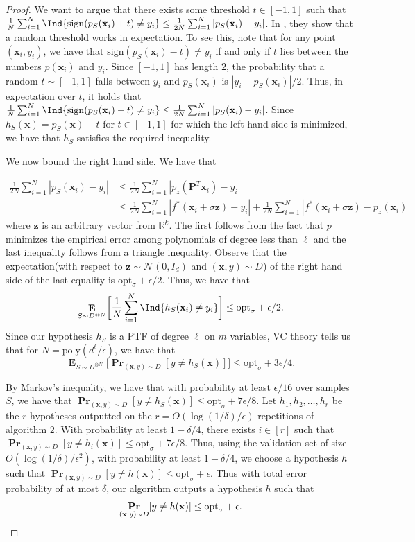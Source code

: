 \documentclass{theoretics}
\renewcommand\vec[1]{\mathbf{#1}}
\DeclareMathOperator*{\pr}{\mathbf{Pr}}
\DeclareMathOperator*{\E}{\mathbf{E}}
\newcommand{\R}{\mathbb{R}}
\newcommand{\poly}{\mathrm{poly}}
\newcommand{\sign}{\mathrm{sign}}
\newcommand{\1}{\Ind}
\newcommand{\smoothopt}{\mathrm{opt}_{\sigma}}
\newcommand{\x}{\vec x}
\newcommand{\z}{\vec z}
\newcommand{\Gauss}{\mathcal{N}}
\newcommand{\Djoint}{D}
\begin{document}
\begin{proof}
    We want to argue that there exists some threshold $t\in [-1,1]$ such that 
    $\frac{1}{N}\sum_{i=1}^{N} \1\{\sign(p_S(\x_i)+t)\neq y_i\}\leq \frac{1}{2N}\sum_{i=1}^{N}|p_S(\x_i)-y_i|$. In \cite{KKMS:05}, they show that a random threshold works in expectation. To see this, note that for any point $(\x_i,y_i)$, we have that $\sign(p_S(\x_i)-t)\neq y_i$ if and only if $t$ lies between the numbers $p(\x_i)$ and $y_i$. Since $[-1,1]$ has length $2$, the probability that a random $t\sim [-1,1]$ falls between $y_i$ and $p_S(\x_i)$ is $|y_i-p_S(\x_i)|/2$. Thus, in expectation over $t$, it holds that $\frac{1}{N}\sum_{i=1}^{N} \1\{\sign(p_S(\x_i)-t)\neq y_i\}\leq \frac{1}{2N}\sum_{i=1}^{N}|p_S(\x_i)-y_i|$. Since $h_S(\x)=p_S(\x)-t$  for  $t\in[-1,1]$ for which the left hand side is minimized, we have that $h_S$ satisfies the required inequality.
    
      We now bound the right hand side. We have that
    
    \begin{align*}
    \frac{1}{2N}\sum_{i=1}^{N}|p_S(\x_i)-y_i|
    &\leq \frac{1}{2N}\sum_{i=1}^{N}|{p}_{z}(\vec P^T \x_i)-y_i|\\
    &\leq \frac{1}{2N}\sum_{i=1}^{N}|f^*(\x_i+\sigma \z)-y_i|+\frac{1}{2N}\sum_{i=1}^{N}|f^*(\x_i+\sigma\z)-{p}_z(\x_i)|
    \end{align*}
    where $\z$ is an arbitrary vector from $\R^{k}$. The first follows from the fact that $p$ minimizes the empirical error among polynomials of degree less than $\ell$ and the last inequality follows from a triangle inequality. Observe that the expectation(with respect to $\z\sim \Gauss(0,I_d)$ and $(\x,y)\sim D$) of the right hand side of the last equality is $\smoothopt+\epsilon/2$.  
    Thus, we have that 
\[
\E_{S\sim D^{\otimes N}}\biggl[\frac{1}{N}\sum_{i=1}^{N}\1\{h_S(\x_i)\neq y_i\}\biggr]\leq \smoothopt+\epsilon/2.
\] Since our hypothesis $h_S$ is a PTF of degree $\ell$ on $m$ variables, VC theory tells us that for $N=\poly(d^{\ell}/\epsilon)$, we have that 
\[
\E_{S\sim D^{\otimes N}}\biggl[\pr_{(\x, y) \sim \Djoint}[y\neq h_S(\x)]\biggr]\leq \smoothopt+3\epsilon/4.
\] 

By Markov's inequality, we have that with probability at least $\epsilon/16$ over samples $S$, we have that $\pr_{(\x, y) \sim \Djoint}[y\neq h_S(\x)]\leq \smoothopt+ 7\epsilon/8$. Let $h_1,h_2,\ldots, h_r$ be the $r$ hypotheses outputted on the $r=O(\log(1/\delta)/\epsilon)$ repetitions of algorithm $2$. With probability at least $1-\delta/4$, there exists $i\in [r]$ such that  $\pr_{(\x, y) \sim \Djoint}[y\neq h_i(\x)]\leq \smoothopt+ 7\epsilon/8$. Thus, using the validation set of size $O(\log(1/\delta)/\epsilon^2)$, with probability at least $1-\delta/4$, we choose a hypothesis $h$ such that $\pr_{(\x, y) \sim \Djoint}[y\neq h(\x)]\leq \smoothopt+ \epsilon$. Thus with total error probability of at most $\delta$, our algorithm outputs a hypothesis $h$ such that
\[
\pr_{(\x,y)\sim D}[y\neq h(\x)]\leq \smoothopt+\epsilon. \qedhere
\]
\end{proof}
\end{document}
